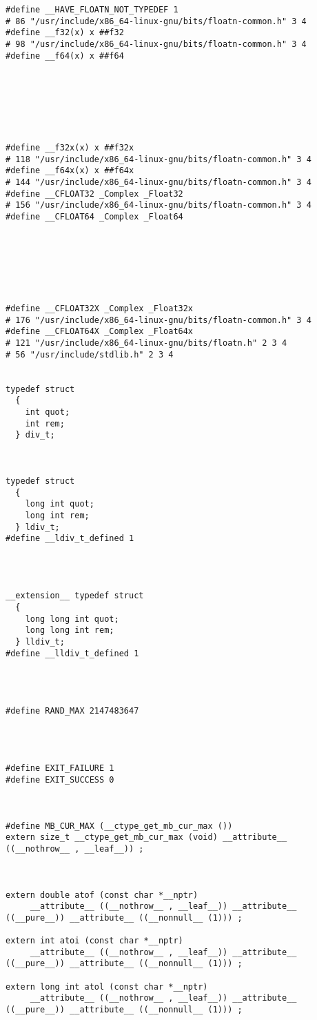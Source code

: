 \documentclass[11pt]{article}
\begin{document}
\begin{verbatim}
#define __HAVE_FLOATN_NOT_TYPEDEF 1
# 86 "/usr/include/x86_64-linux-gnu/bits/floatn-common.h" 3 4
#define __f32(x) x ##f32
# 98 "/usr/include/x86_64-linux-gnu/bits/floatn-common.h" 3 4
#define __f64(x) x ##f64







#define __f32x(x) x ##f32x
# 118 "/usr/include/x86_64-linux-gnu/bits/floatn-common.h" 3 4
#define __f64x(x) x ##f64x
# 144 "/usr/include/x86_64-linux-gnu/bits/floatn-common.h" 3 4
#define __CFLOAT32 _Complex _Float32
# 156 "/usr/include/x86_64-linux-gnu/bits/floatn-common.h" 3 4
#define __CFLOAT64 _Complex _Float64







#define __CFLOAT32X _Complex _Float32x
# 176 "/usr/include/x86_64-linux-gnu/bits/floatn-common.h" 3 4
#define __CFLOAT64X _Complex _Float64x
# 121 "/usr/include/x86_64-linux-gnu/bits/floatn.h" 2 3 4
# 56 "/usr/include/stdlib.h" 2 3 4


typedef struct
  {
    int quot;
    int rem;
  } div_t;



typedef struct
  {
    long int quot;
    long int rem;
  } ldiv_t;
#define __ldiv_t_defined 1




__extension__ typedef struct
  {
    long long int quot;
    long long int rem;
  } lldiv_t;
#define __lldiv_t_defined 1




#define RAND_MAX 2147483647




#define EXIT_FAILURE 1
#define EXIT_SUCCESS 0



#define MB_CUR_MAX (__ctype_get_mb_cur_max ())
extern size_t __ctype_get_mb_cur_max (void) __attribute__ ((__nothrow__ , __leaf__)) ;



extern double atof (const char *__nptr)
     __attribute__ ((__nothrow__ , __leaf__)) __attribute__ ((__pure__)) __attribute__ ((__nonnull__ (1))) ;

extern int atoi (const char *__nptr)
     __attribute__ ((__nothrow__ , __leaf__)) __attribute__ ((__pure__)) __attribute__ ((__nonnull__ (1))) ;

extern long int atol (const char *__nptr)
     __attribute__ ((__nothrow__ , __leaf__)) __attribute__ ((__pure__)) __attribute__ ((__nonnull__ (1))) ;




\end{verbatim}
\end{document}
